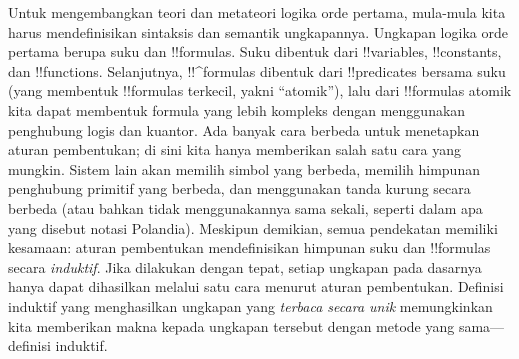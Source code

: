 \documentclass[../../../include/open-logic-section]{subfiles}
\begin{document}


Untuk mengembangkan teori dan metateori logika orde pertama, mula-mula kita
harus mendefinisikan sintaksis dan semantik ungkapannya. Ungkapan logika orde
pertama berupa suku dan !!{formula}s. Suku dibentuk dari !!{variable}s,
!!{constant}s, dan !!{function}s. Selanjutnya, !!^{formula}s dibentuk dari
!!{predicate}s bersama suku (yang membentuk !!{formula}s terkecil, yakni
``atomik''), lalu dari !!{formula}s atomik kita dapat membentuk formula yang
lebih kompleks dengan menggunakan penghubung logis dan kuantor. Ada banyak
cara berbeda untuk menetapkan aturan pembentukan; di sini kita hanya
memberikan salah satu cara yang mungkin. Sistem lain akan memilih simbol
yang berbeda, memilih himpunan penghubung primitif yang berbeda, dan
menggunakan tanda kurung secara berbeda (atau bahkan tidak menggunakannya
sama sekali, seperti dalam apa yang disebut notasi Polandia). Meskipun
demikian, semua pendekatan memiliki kesamaan: aturan pembentukan
mendefinisikan himpunan suku dan !!{formula}s secara \emph{induktif}. Jika
dilakukan dengan tepat, setiap ungkapan pada dasarnya hanya dapat dihasilkan
melalui satu cara menurut aturan pembentukan. Definisi induktif yang
menghasilkan ungkapan yang \emph{terbaca secara unik} memungkinkan kita
memberikan makna kepada ungkapan tersebut dengan metode yang sama---definisi
induktif.
\end{document}
